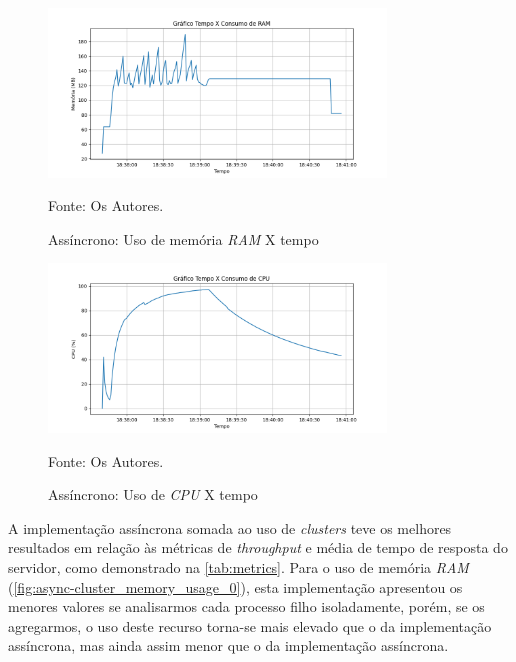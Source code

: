 \documentclass[12pt]{article}
\begin{document}
\begin{figure}[!h]
\centering
\caption{Assíncrono: Uso de memória \textit{RAM} X tempo}
\includegraphics[width=0.8\textwidth]{images/pt-br/results/async_memory_usage.png}
\label{fig:async_memory_usage}

Fonte: Os Autores.
\end{figure}



\begin{figure}[!h]
\centering
\caption{Assíncrono: Uso de \textit{CPU} X tempo}
\includegraphics[width=0.8\textwidth]{images/pt-br/results/async_cpu_usage.png}
\label{fig:async_cpu_usage}

Fonte: Os Autores.
\end{figure}


A implementação assíncrona somada ao uso de \textit{clusters} teve os melhores resultados
em relação às métricas de \textit{throughput} e média de tempo de resposta do servidor,
como demonstrado na \autoref{tab:metrics}. Para o uso de memória \textit{RAM} 
(\autoref{fig:async-cluster_memory_usage_0}), esta implementação
apresentou os menores valores se analisarmos cada processo filho isoladamente, porém, se os
agregarmos, o uso deste recurso torna-se mais elevado que o da implementação assíncrona, mas
ainda assim menor que o da implementação assíncrona.
\end{document}
